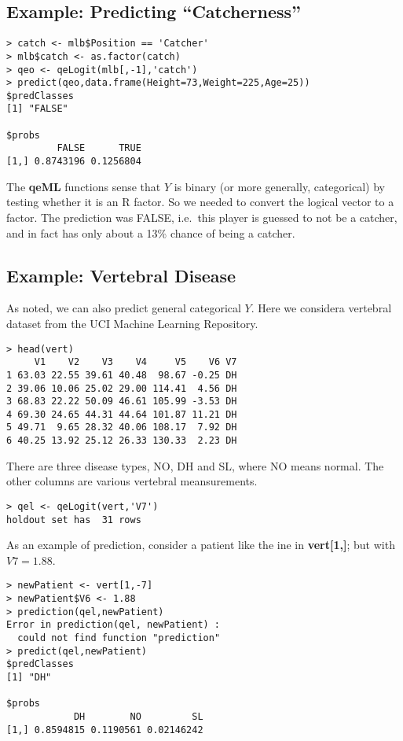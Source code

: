 \subsection{Example:  Predicting ``Catcherness''}

\begin{lstlisting}
> catch <- mlb$Position == 'Catcher'
> mlb$catch <- as.factor(catch)
> qeo <- qeLogit(mlb[,-1],'catch')
> predict(qeo,data.frame(Height=73,Weight=225,Age=25))
$predClasses
[1] "FALSE"

$probs
         FALSE      TRUE
[1,] 0.8743196 0.1256804
\end{lstlisting}

The \textbf{qeML} functions sense that $Y$ is binary (or more generally,
categorical) by testing whether it is an R factor.  So we needed to
convert the logical vector to a factor.  The prediction was FALSE, i.e.\
this player is guessed to not be a catcher, and in fact has only about a
13\% chance of being a catcher.

\subsection{Example:  Vertebral Disease}

As noted, we can also predict general categorical $Y$.  Here we
considera vertebral dataset from the UCI Machine Learning Repository.

\begin{lstlisting}
> head(vert)
     V1    V2    V3    V4     V5    V6 V7
1 63.03 22.55 39.61 40.48  98.67 -0.25 DH
2 39.06 10.06 25.02 29.00 114.41  4.56 DH
3 68.83 22.22 50.09 46.61 105.99 -3.53 DH
4 69.30 24.65 44.31 44.64 101.87 11.21 DH
5 49.71  9.65 28.32 40.06 108.17  7.92 DH
6 40.25 13.92 25.12 26.33 130.33  2.23 DH
\end{lstlisting}

There are three disease types, NO, DH and SL, where NO means normal.
The other columns are various vertebral meansurements.

\begin{lstlisting}
> qel <- qeLogit(vert,'V7')
holdout set has  31 rows
\end{lstlisting}

As an example of prediction, consider a patient like the ine in
\textbf{vert[1,]}; but with $V7 = 1.88$.

\begin{lstlisting}
> newPatient <- vert[1,-7]
> newPatient$V6 <- 1.88
> prediction(qel,newPatient)
Error in prediction(qel, newPatient) : 
  could not find function "prediction"
> predict(qel,newPatient)
$predClasses
[1] "DH"

$probs
            DH        NO         SL
[1,] 0.8594815 0.1190561 0.02146242
\end{lstlisting}

